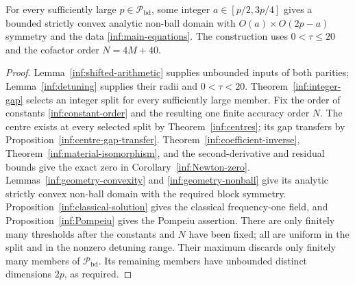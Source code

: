 \begin{corollary}\label{inf:bounded-basic}
For every sufficiently large $p\in\mathcal P_{\mathrm{bd}}$, some
integer $a\in[p/2,3p/4]$ gives a bounded strictly convex analytic
non-ball domain with $O(a)\times O(2p-a)$ symmetry and the data
\eqref{inf:main-equations}. The construction uses
$0<\tau\le20$ and the cofactor order $N=4M+40$.
\end{corollary}
\begin{proof}
Lemma~\ref{inf:shifted-arithmetic} supplies unbounded inputs of both
parities; Lemma~\ref{inf:detuning} supplies their radii and
$0<\tau<20$. Theorem~\ref{inf:integer-gap} selects an integer
split for every sufficiently large member. Fix the order of
constants \eqref{inf:constant-order} and the resulting one finite
accuracy order $N$.
The centre exists at every selected split by
Theorem~\ref{inf:centres}; its gap transfers by
Proposition~\ref{inf:centre-gap-transfer}.
Theorem~\ref{inf:coefficient-inverse},
Theorem~\ref{inf:material-isomorphism}, and the second-derivative
and residual bounds give the exact zero in
Corollary~\ref{inf:Newton-zero}.
Lemmas~\ref{inf:geometry-convexity} and
\ref{inf:geometry-nonball} give its analytic strictly convex
non-ball domain with the required block symmetry.
Proposition~\ref{inf:classical-solution} gives the classical
frequency-one field, and Proposition~\ref{inf:Pompeiu} gives the
Pompeiu assertion.
There are only finitely many thresholds after the constants and
$N$ have been fixed; all are uniform in the split and in the
nonzero detuning range. Their maximum discards only finitely
many members of $\mathcal P_{\mathrm{bd}}$. Its remaining members have
unbounded distinct dimensions $2p$, as required.
\end{proof}

